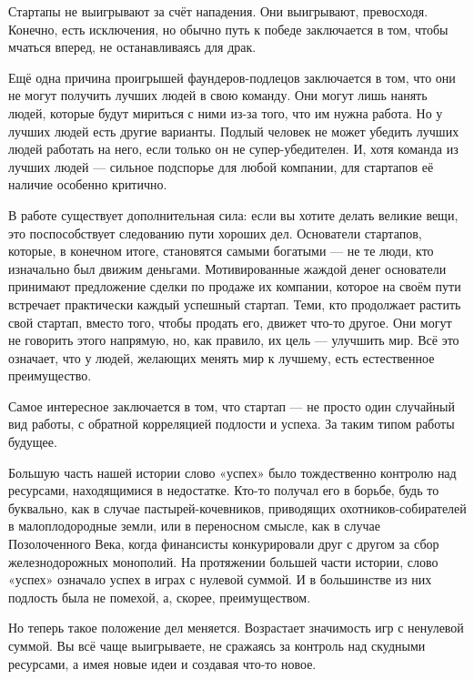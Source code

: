 \documentclass[ebook,12pt,oneside,openany]{memoir}
\begin{document}
Стартапы не выигрывают за счёт нападения. Они выигрывают, превосходя.
Конечно, есть исключения, но обычно путь к победе заключается в том,
чтобы мчаться вперед, не останавливаясь для драк. \newline

Ещё одна причина проигрышей фаундеров-подлецов заключается в том, что
они не могут получить лучших людей в свою команду. Они могут лишь
нанять людей, которые будут мириться с ними из-за того, что им нужна
работа. Но у лучших людей есть другие варианты. Подлый человек не
может убедить лучших людей работать на него, если только он не
супер-убедителен. И, хотя команда из лучших людей — сильное подспорье
для любой компании, для стартапов её наличие особенно критично. \newline

В работе существует дополнительная сила: если вы хотите делать великие
вещи, это поспособствует следованию пути хороших дел. Основатели
стартапов, которые, в конечном итоге, становятся самыми богатыми — не
те люди, кто изначально был движим деньгами. Мотивированные жаждой
денег основатели принимают предложение сделки по продаже их компании,
которое на своём пути встречает практически каждый успешный стартап.
Теми, кто продолжает растить свой стартап, вместо того, чтобы продать
его, движет что-то другое. Они могут не говорить этого напрямую, но,
как правило, их цель — улучшить мир. Всё это означает, что у людей,
желающих менять мир к лучшему, есть естественное преимущество. \newline

Самое интересное заключается в том, что стартап — не просто один
случайный вид работы, с обратной корреляцией подлости и успеха. За
таким типом работы будущее. \newline

Большую часть нашей истории слово «успех» было тождественно контролю
над ресурсами, находящимися в недостатке. Кто-то получал его в борьбе,
будь то буквально, как в случае пастырей-кочевников, приводящих
охотников-собирателей в малоплодородные земли, или в переносном
смысле, как в случае Позолоченного Века, когда финансисты
конкурировали друг с другом за сбор железнодорожных монополий. На
протяжении большей части истории, слово «успех» означало успех в играх
с нулевой суммой. И в большинстве из них подлость была не помехой, а,
скорее, преимуществом. \newline

Но теперь такое положение дел меняется. Возрастает значимость игр с
ненулевой суммой. Вы всё чаще выигрываете, не сражаясь за контроль над
скудными ресурсами, а имея новые идеи и создавая что-то новое. \newline
\end{document}

